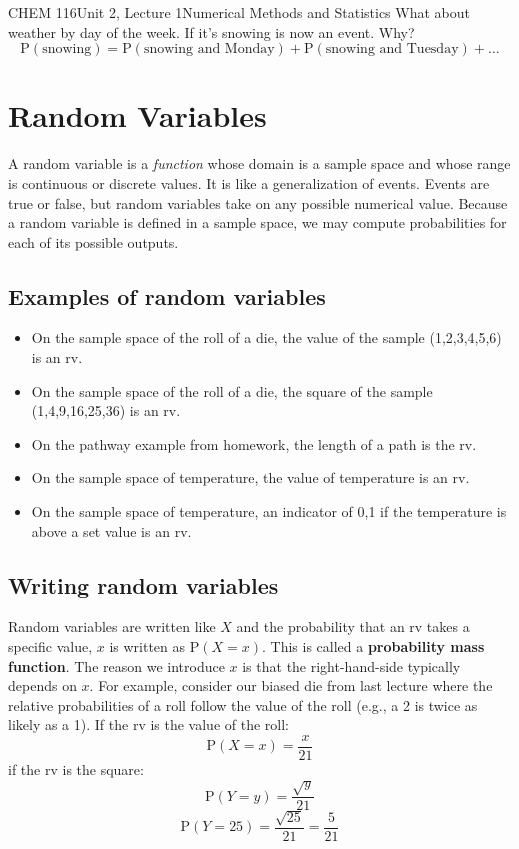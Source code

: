 \documentclass{article}
\renewcommand{\Pr}{\textrm{P}}
\begin{document}
\begin{tdoc}{CHEM 116}{Unit 2, Lecture 1}{Numerical Methods and Statistics}
What about weather by day of the week. If it's snowing is now an
event. Why?
\[
\Pr(\textrm{snowing}) = \Pr(\textrm{snowing and Monday}) + \Pr(\textrm{snowing and Tuesday}) + \ldots
\]

\section{Random Variables}

A random variable is a \emph{function} whose domain is a sample space
and whose range is continuous or discrete values. It is like a
generalization of events. Events are true or false, but random
variables take on any possible numerical value. Because a random
variable is defined in a sample space, we may compute probabilities
for each of its possible outputs.

\subsection{Examples of random variables}

\begin{itemize}

\item On the sample space of the roll of a die, the value of the
  sample (1,2,3,4,5,6) is an rv.


\item On the sample space of the roll of a die, the square of the
  sample (1,4,9,16,25,36) is an rv.

\item On the pathway example from homework, the
  length of a path is the rv.

\item On the sample space of temperature, the value of
  temperature is an rv.

\item On the sample space of temperature, an indicator of 0,1 if the
  temperature is above a set value is an rv.

\end{itemize}

\subsection{Writing random variables}

Random variables are written like $X$ and the probability that an rv
takes a specific value, $x$ is written as $\Pr(X=x)$. This is called a
{\bf probability mass function}. The reason we introduce $x$ is that
the right-hand-side typically depends on $x$. For example, consider
our biased die from last lecture where the relative probabilities of a
roll follow the value of the roll (e.g., a 2 is twice as likely as a
1). If the rv is the value of the roll:
\[
\Pr(X=x) = \frac{x}{21}
\]
if the rv is the square:
\[
\Pr(Y=y) = \frac{\sqrt{y}}{21}
\]
\[
\Pr(Y=25) = \frac{\sqrt{25}}{21} = \frac{5}{21}
\]


\end{tdoc}
\end{document}
